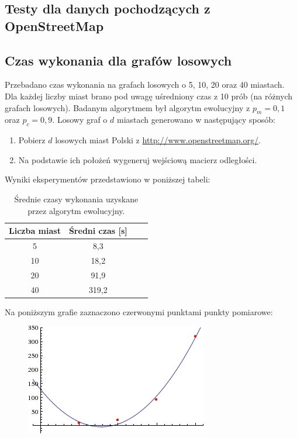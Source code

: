 \documentclass[12pt, a4paper]{article}
\begin{document}
\subsection{Testy dla danych pochodzących z OpenStreetMap}
\subsection{Czas wykonania dla grafów losowych}

Przebadano czas wykonania na grafach losowych o 5, 10, 20 oraz 40 miastach.
Dla każdej liczby miast brano pod uwagę uśredniony czas z 10 prób (na różnych grafach losowych).
Badanym algorytmem był algorytm ewolucyjny z $p_m=0,1$ oraz $p_c=0,9$.
Losowy graf o $d$ miastach generowano w następujący sposób:

\begin{enumerate}
 \item Pobierz $d$ losowych miast Polski z \url{http://www.openstreetmap.org/}.
 \item Na podstawie ich położeń wygeneruj wejściową macierz odległości.
\end{enumerate}

Wyniki eksperymentów przedstawiono w poniższej tabeli:

\begin{table}[h]
\centering
	\begin{tabular}{ | c | c | c | c | } 
		\hline
  		Liczba miast & Średni czas [s] \\
  		\hline
  		5 & 8,3 \\
  		\hline
  		10 & 18,2 \\
  		\hline
  		20 & 91,9 \\
  		\hline
  		40 & 319,2 \\
  		\hline
	\end{tabular}
\caption{Średnie czasy wykonania uzyskane przez algorytm ewolucyjny.}
\end{table}

Na poniższym grafie zaznaczono czerwonymi punktami punkty pomiarowe:

\begin{figure}[H]
\centering
  \includegraphics[width=.5\textwidth]{time.png}
\end{figure}
\end{document}
